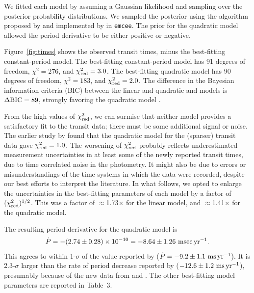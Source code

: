 \documentclass[12pt,twocolumn,tighten]{aastex62}
\begin{document}
We fitted each model by assuming a Gaussian likelihood and sampling
over the posterior probability distributions.  We sampled the
posterior using the algorithm proposed by
\citet{goodman_ensemble_2010} and implemented by
\citet{foreman-mackey_emcee_2013} in \texttt{emcee}.  The prior for
the quadratic model allowed the period derivative to be either
positive or negative.

Figure~\ref{fig:times} shows the observed transit times, minus the
best-fitting constant-period model.  The best-fitting constant-period
model has 91 degrees of freedom, $\chi^2 = 276$, and $\chi^2_{\rm
red}=3.0$.  The best-fitting quadratic model has 90 degrees of
freedom, $\chi^2 = 183$, and $\chi^2_{\rm red}=2.0$.  The difference
in the Bayesian information criteria (BIC) between the linear and
quadratic and models is $\Delta {\rm BIC} = 89$, strongly favoring the
quadratic model \citep{kass_bayes_1995}.

From the high values of $\chi^2_{\rm red}$, we can surmise that
neither model provides a satisfactory fit to the transit data; there
must be some additional signal or noise.  The earlier study by
 found that the quadratic model for the
(sparser) transit data gave $\chi^2_{\rm red}=1.0$.  The worsening of
$\chi^2_{\rm red}$ probably reflects underestimated measurement
uncertainties in at least some of the newly reported transit times,
due to time correlated noise in the photometry. It might also be due
to errors or misunderstandings of the time systems in which the data
were recorded, despite our best efforts to interpret the literature.
In what follows, we opted to enlarge the uncertainties in the
best-fitting parameters of each model by a factor of $(\chi^2_{\rm
red})^{1/2}$.  This was a factor of $\approx$1.73$\times$ for the
linear model, and $\approx$1.41$\times$ for the quadratic model.

The resulting period derivative for the quadratic model is 
\begin{equation}
\dot{P}
  = - (2.74 \pm 0.28)\times 10^{-10}
  = - 8.64 \pm 1.26~{\rm msec}\,{\rm yr}^{-1}.
  \label{eq:dP_dt_obs}
\end{equation}
This agrees to within 1-$\sigma$ of the value reported by
\citet{southworth_transit_2019} ($\dot{P} = - 9.2 \pm 1.1~{\rm
ms}\,{\rm yr}^{-1}$).  It is 2.3-$\sigma$ larger than the rate of
period decrease reported by 
($- 12.6 \pm 1.2~{\rm ms}\,{\rm yr}^{-1}$), presumably because of the new
data from \citeauthor{southworth_transit_2019} and
\citeauthor{baluev_2019}. The other best-fitting model parameters are
reported in Table~3.
\end{document}
